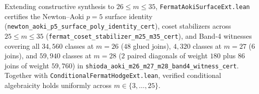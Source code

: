 \documentclass[11pt,a4paper]{article}
\begin{document}
\begin{table}[htbp]
  \centering
  \caption{Complete classification of all Band~4 degrees $24 \le m \le 60$ with non-glued orbits via prime-$p$ arithmetic progressions and mixed-Hodge $X_m^2 \#_c X_m^2$ gluing ($0$ unexplained across $3 \le m \le 60$).}
  \label{tab:m60_sporadic}
\end{table}

Extending constructive synthesis to $26 \le m \le 35$, \texttt{Fermat\allowbreak{}Aoki\allowbreak{}Surface\allowbreak{}Ext.lean} certifies the Newton--Aoki $p=5$ surface identity (\texttt{newton\_\allowbreak{}aoki\_\allowbreak{}p5\_\allowbreak{}surface\_\allowbreak{}poly\_\allowbreak{}identity\_\allowbreak{}cert}), coset stabilizers across $25 \le m \le 35$ (\texttt{fermat\_\allowbreak{}coset\_\allowbreak{}stabilizer\_\allowbreak{}m25\_\allowbreak{}m35\_\allowbreak{}cert}), and Band-4 witnesses covering all $34{,}560$ classes at $m=26$ ($48$ glued joins), $4{,}320$ classes at $m=27$ ($6$ joins), and $59{,}940$ classes at $m=28$ ($2$ paired diagonals of weight $180$ plus $86$ joins of weight $59{,}760$) in \texttt{shioda\_\allowbreak{}aoki\_\allowbreak{}m26\_\allowbreak{}m27\_\allowbreak{}m28\_\allowbreak{}band4\_\allowbreak{}witness\_\allowbreak{}cert}. Together with \texttt{Conditional\allowbreak{}Fermat\allowbreak{}Hodge\allowbreak{}Ext.lean}, verified conditional algebraicity holds uniformly across $m \in \{3,\dots,25\}$.
\end{document}
